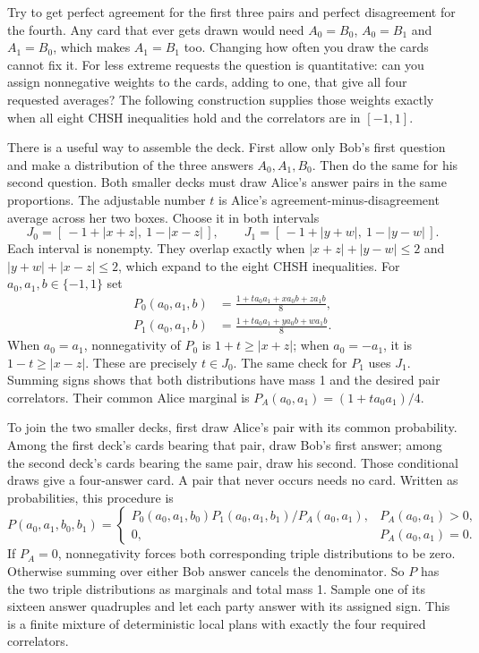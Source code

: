 \documentclass[11pt,twoside]{article}
\theoremstyle{thielethm}
\theoremstyle{thieledef}
\theoremstyle{thieledef}
\theoremstyle{thieledef}
\theoremstyle{thielethm}
\theoremstyle{thieleobs}
\theoremstyle{thielethm}
\begin{document}
Try to get perfect agreement for the first three pairs and perfect disagreement
for the fourth. Any card that ever gets drawn would need $A_0=B_0$, $A_0=B_1$
and $A_1=B_0$, which makes $A_1=B_1$ too. Changing how often you draw the cards
cannot fix it. For less extreme requests the question is quantitative: can you
assign nonnegative weights to the cards, adding to one, that give all four
requested averages? The following construction supplies those weights exactly
when all eight CHSH inequalities hold and the correlators are in $[-1,1]$.

There is a useful way to assemble the deck. First allow only Bob's first question
and make a distribution of the three answers $A_0,A_1,B_0$. Then do the same for
his second question. Both smaller decks must draw Alice's answer pairs in the
same proportions. The adjustable number $t$ is Alice's agreement-minus-disagreement
average across her two boxes. Choose it in both intervals
\[
J_0=[\,-1+|x+z|,\ 1-|x-z|\,],\qquad
J_1=[\,-1+|y+w|,\ 1-|y-w|\,].
\]
Each interval is nonempty. They overlap exactly when
$|x+z|+|y-w|\le2$ and $|y+w|+|x-z|\le2$, which expand to the eight
CHSH inequalities. For $a_0,a_1,b\in\{-1,1\}$ set
\[
\begin{aligned}
P_0(a_0,a_1,b)&=\frac{1+t a_0a_1+x a_0b+z a_1b}{8},\\
P_1(a_0,a_1,b)&=\frac{1+t a_0a_1+y a_0b+w a_1b}{8}.
\end{aligned}
\]
When $a_0=a_1$, nonnegativity of $P_0$ is $1+t\ge|x+z|$;
when $a_0=-a_1$, it is $1-t\ge|x-z|$. These are precisely $t\in J_0$.
The same check for $P_1$ uses $J_1$. Summing signs shows that both distributions
have mass 1 and the desired pair correlators. Their common Alice marginal is
$P_A(a_0,a_1)=(1+t a_0a_1)/4$.

To join the two smaller decks, first draw Alice's pair with its common probability.
Among the first deck's cards bearing that pair, draw Bob's first answer; among
the second deck's cards bearing the same pair, draw his second. Those conditional
draws give a four-answer card. A pair that never occurs needs no card. Written
as probabilities, this procedure is
\[
P(a_0,a_1,b_0,b_1)=
\begin{cases}
P_0(a_0,a_1,b_0)P_1(a_0,a_1,b_1)/P_A(a_0,a_1),&P_A(a_0,a_1)>0,\\
0,&P_A(a_0,a_1)=0.
\end{cases}
\]
If $P_A=0$, nonnegativity forces both corresponding triple distributions to be zero.
Otherwise summing over either Bob answer cancels the denominator. So $P$ has the
two triple distributions as marginals and total mass 1. Sample one of its sixteen
answer quadruples and let each party answer with its assigned sign. This is a finite
mixture of deterministic local plans with exactly the four required correlators.
\end{document}
